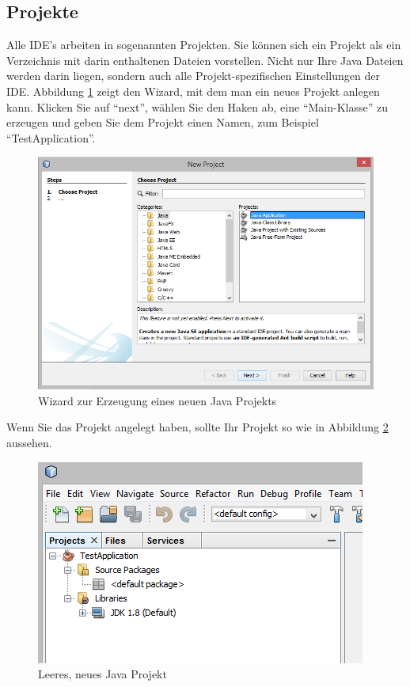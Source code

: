 \subsection{Projekte}

Alle IDE's arbeiten in sogenannten Projekten. Sie können sich ein Projekt als ein Verzeichnis mit darin enthaltenen Dateien vorstellen. Nicht nur Ihre Java Dateien werden darin liegen, sondern auch alle Projekt-spezifischen Einstellungen der IDE. Abbildung \ref{nb:newproj} zeigt den Wizard, mit dem man ein neues Projekt anlegen kann. Klicken Sie auf "`next"', wählen Sie den Haken ab, eine "`Main-Klasse"' zu erzeugen und geben Sie dem Projekt einen Namen, zum Beispiel "`TestApplication"'.

\begin{figure}[h]
\centering
\includegraphics[width=\textwidth]{img/nb001}
\caption{Wizard zur Erzeugung eines neuen Java Projekts}
\label{nb:newproj}
\end{figure}

Wenn Sie das Projekt angelegt haben, sollte Ihr Projekt so wie in Abbildung \ref{nb:emptproj} aussehen.

\begin{figure}[h]
\centering
\includegraphics[]{img/nb002}
\caption{Leeres, neues Java Projekt}
\label{nb:emptproj}
\end{figure}

